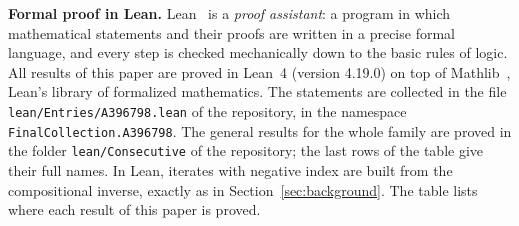 \documentclass[11pt,a4paper]{article}
\theoremstyle{definition}
\theoremstyle{remark}
\newcommand{\para}[1]{\par\medskip\noindent\textbf{#1}\enspace}
\begin{document}
\para{Formal proof in Lean.}
Lean~\cite{lean} is a \emph{proof assistant}: a program in which mathematical statements and their proofs are written
in a precise formal language, and every step is checked mechanically down to the basic rules of logic. All results of
this paper are proved in Lean~4 (version 4.19.0) on top of Mathlib~\cite{mathlib}, Lean's library of formalized
mathematics. The statements are collected in the file \texttt{lean/Entries/A396798.lean} of the repository,
in the namespace \texttt{FinalCollection.A396798}. The general results for the whole family are proved in the folder \texttt{lean/Consecutive} of the
repository; the last rows of the table give their full names. In Lean, iterates with negative index are built from the
compositional inverse, exactly as in Section~\ref{sec:background}.
The table lists where each result of this paper is proved.
\end{document}
